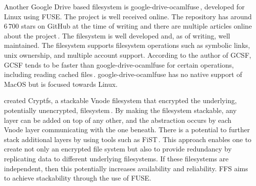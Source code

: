 Another Google Drive based filesystem is google-drive-ocamlfuse\,\cite{stradaGoogledriveocamlfuse2022}, developed for Linux using FUSE. The project is well received online. The repository has around $6\,700$ stars on GitHub at the time of writing and there are multiple articles online about the project\,\cite{guoanInstallGoogleDrive2021,sneddonMountYourGoogle2017,aminUseGoogleDrive2021}. The filesystem is well developed and, as of writing, well maintained. The filesystem supports filesystem operations such as symbolic links, unix ownership, and multiple account support. According to the author of GCSF, GCSF tends to be faster than google-drive-ocamlfuse for certain operations, including reading cached files\,\cite{shubhamharnalShortGCSFTends2018,harababurelShowHNGoogle2018,}. google-drive-ocamlfuse has no native support of MacOS but is focused towards Linux. 

\citeauthor{zadokCryptfsStackableVnode1998} created Cryptfs, a stackable Vnode filesystem that encrypted the underlying, potentially unencrypted, filesystem\,\cite{zadokCryptfsStackableVnode1998}. By making the filesystem stackable, any layer can be added on top of any other, and the abstraction occurs by each Vnode layer communicating with the one beneath. There is a potential to further stack additional layers by using tools such as FiST\,\cite{FiSTStackableFile}. This approach enables one to create not only an encrypted file system but also to provide redundancy by replicating data to different underlying filesystems. If these filesystems are independent, then this potentially increases availability and reliability. FFS aims to achieve stackability through the use of FUSE. 
